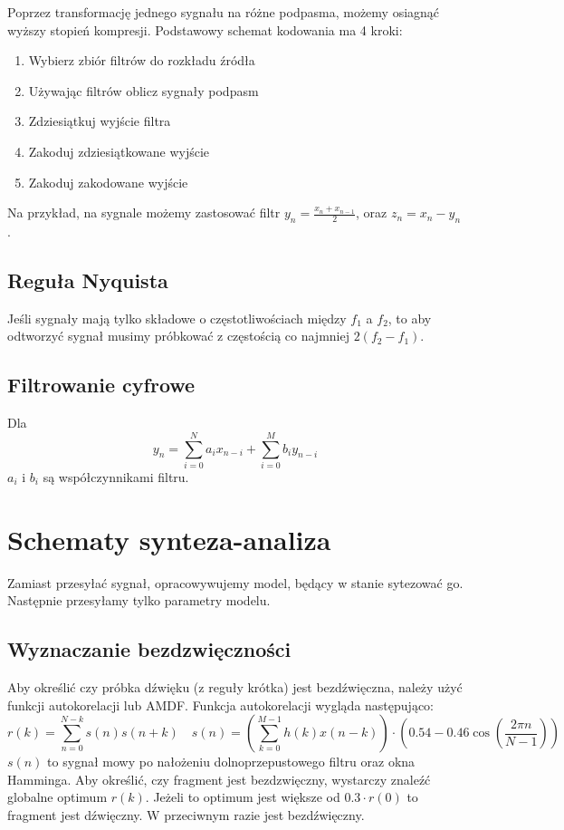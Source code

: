 \documentclass{../notatki}
\begin{document}
Poprzez transformację jednego sygnału na różne podpasma, możemy
osiagnąć wyższy stopień kompresji. Podstawowy schemat kodowania ma 4 kroki:
\begin{enumerate}
\item Wybierz zbiór filtrów do rozkładu źródła
\item Używając filtrów oblicz sygnały podpasm
\item Zdziesiątkuj wyjście filtra
\item Zakoduj zdziesiątkowane wyjście
\item Zakoduj zakodowane wyjście
\end{enumerate}

Na przykład, na sygnale możemy zastosować filtr $y_n = \frac{x_n +
x_{n - 1}}{2}$, oraz $z_n = x_n - y_n$.

\subsection{Reguła Nyquista}

Jeśli sygnały mają tylko składowe o częstotliwościach między $f_1$ a $f_2$, to
aby odtworzyć sygnał musimy próbkować z częstością co najmniej $2(f_2 - f_1)$.

\subsection{Filtrowanie cyfrowe}

Dla
$$
y_n =\sum_{i=0}^{N} a_i x_{n-i} + \sum_{i=0}^{M} b_i y_{n-i}
$$
$a_i$ i $b_i$ są współczynnikami filtru.

\section{Schematy synteza-analiza}

Zamiast przesyłać sygnał, opracowywujemy model, będący w stanie sytezować go.
Następnie przesyłamy tylko parametry modelu.

\subsection{Wyznaczanie bezdzwięczności}

Aby określić czy próbka dźwięku (z reguły krótka) jest bezdźwięczna, należy
użyć funkcji autokorelacji lub AMDF. Funkcja autokorelacji wygląda
następująco:
$$
r(k) = \sum_{n=0}^{N-k} s(n)s(n + k) \quad s(n) = (\sum_{k=0}^{M -
1}h(k)x(n - k)) \cdot (0.54 - 0.46 \cos(\frac{2\pi n}{N - 1}))
$$
$s(n)$ to sygnał mowy po nałożeniu dolnoprzepustowego filtru oraz okna Hamminga.
Aby określić, czy fragment jest bezdzwięczny, wystarczy znaleźć globalne optimum
$r(k)$. Jeżeli to optimum jest większe od $0.3 \cdot r(0)$ to fragment jest
dźwięczny. W przeciwnym razie jest bezdźwięczny.
\end{document}
